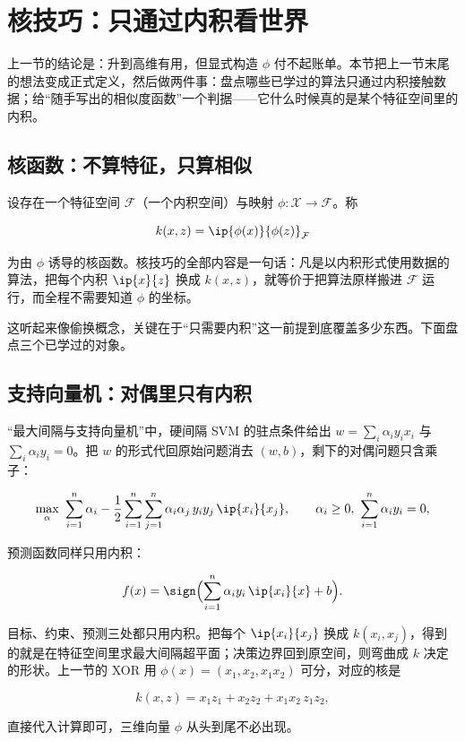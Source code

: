 \section{核技巧：只通过内积看世界}

上一节的结论是：升到高维有用，但显式构造 \(\phi\) 付不起账单。本节把上一节末尾的想法变成正式定义，然后做两件事：盘点哪些已学过的算法只通过内积接触数据；给``随手写出的相似度函数''一个判据——它什么时候真的是某个特征空间里的内积。

\subsection{核函数：不算特征，只算相似}

设存在一个特征空间 \(\mathcal{F}\)（一个内积空间）与映射 \(\phi:\mathcal{X}\to\mathcal{F}\)。称

\[
k(x,z)=\ip{\phi(x)}{\phi(z)}_{\mathcal{F}}
\]

为由 \(\phi\) 诱导的核函数。核技巧的全部内容是一句话：凡是以内积形式使用数据的算法，把每个内积 \(\ip{x}{z}\) 换成 \(k(x,z)\)，就等价于把算法原样搬进 \(\mathcal{F}\) 运行，而全程不需要知道 \(\phi\) 的坐标。

这听起来像偷换概念，关键在于``只需要内积''这一前提到底覆盖多少东西。下面盘点三个已学过的对象。

\subsection{支持向量机：对偶里只有内积}

``最大间隔与支持向量机''中，硬间隔 SVM 的驻点条件给出 \(w=\sum_i\alpha_iy_ix_i\) 与 \(\sum_i\alpha_iy_i=0\)。把 \(w\) 的形式代回原始问题消去 \((w,b)\)，剩下的对偶问题只含乘子：

\[
\max_{\alpha}\ \sum_{i=1}^{n}\alpha_i
-\frac12\sum_{i=1}^{n}\sum_{j=1}^{n}
\alpha_i\alpha_j\,y_iy_j\,\ip{x_i}{x_j},
\qquad
\alpha_i\ge0,\ \sum_{i=1}^{n}\alpha_iy_i=0,
\]

预测函数同样只用内积：

\[
f(x)=\sign\Bigl(\sum_{i=1}^{n}\alpha_iy_i\,\ip{x_i}{x}+b\Bigr).
\]

目标、约束、预测三处都只用内积。把每个 \(\ip{x_i}{x_j}\) 换成 \(k(x_i,x_j)\)，得到的就是在特征空间里求最大间隔超平面；决策边界回到原空间，则弯曲成 \(k\) 决定的形状。上一节的 XOR 用 \(\phi(x)=(x_1,x_2,x_1x_2)\) 可分，对应的核是

\[
k(x,z)=x_1z_1+x_2z_2+x_1x_2\,z_1z_2,
\]

直接代入计算即可，三维向量 \(\phi\) 从头到尾不必出现。

